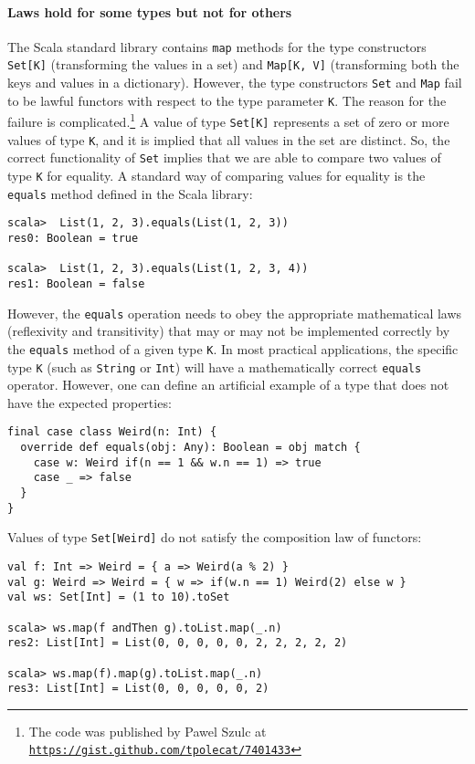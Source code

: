 \paragraph{Laws hold for some types but not for others}

The Scala standard library contains \lstinline!map! methods for the
type constructors \lstinline!Set[K]! (transforming the values in
a set) and \lstinline!Map[K, V]! (transforming both the keys and
values in a dictionary). However, the type constructors \lstinline!Set!
and \lstinline!Map! fail to be lawful functors with respect to the
type parameter \lstinline!K!. The reason for the failure is complicated.\footnote{The code was published by Pawel Szulc at \texttt{\href{https://gist.github.com/tpolecat/7401433}{https://gist.github.com/tpolecat/7401433}}}
A value of type \lstinline!Set[K]! represents a set of zero or more
values of type \lstinline!K!, and it is implied that all values in
the set are distinct. So, the correct functionality of \lstinline!Set!
implies that we are able to compare two values of type \lstinline!K!
for equality. A standard way of comparing values for equality is the
\lstinline!equals! method defined in the Scala library:
\begin{lstlisting}
scala>  List(1, 2, 3).equals(List(1, 2, 3))
res0: Boolean = true

scala>  List(1, 2, 3).equals(List(1, 2, 3, 4))
res1: Boolean = false
\end{lstlisting}
However, the \lstinline!equals! operation needs to obey the appropriate
mathematical laws (reflexivity and transitivity) that may or may not
be implemented correctly by the \lstinline!equals! method of a given
type \lstinline!K!. In most practical applications, the specific
type \lstinline!K! (such as \lstinline!String! or \lstinline!Int!)
will have a mathematically correct \lstinline!equals! operator. However,
one can define an artificial example of a type that does not have
the expected properties:
\begin{lstlisting}
final case class Weird(n: Int) {
  override def equals(obj: Any): Boolean = obj match {
    case w: Weird if(n == 1 && w.n == 1) => true
    case _ => false
  }
}
\end{lstlisting}
Values of type \lstinline!Set[Weird]! do not satisfy the composition
law of functors:
\begin{lstlisting}
val f: Int => Weird = { a => Weird(a % 2) }
val g: Weird => Weird = { w => if(w.n == 1) Weird(2) else w }
val ws: Set[Int] = (1 to 10).toSet

scala> ws.map(f andThen g).toList.map(_.n)
res2: List[Int] = List(0, 0, 0, 0, 0, 2, 2, 2, 2, 2)

scala> ws.map(f).map(g).toList.map(_.n)
res3: List[Int] = List(0, 0, 0, 0, 0, 2)
\end{lstlisting}

